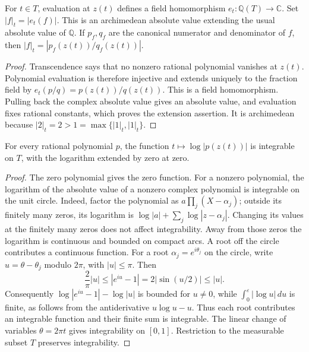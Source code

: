 \begin{definition}
\label{def:rational-archimedean-place}
\leanok
For $t\in T$, evaluation at $z(t)$ defines a field homomorphism
$e_t:\mathbb Q(T)\longrightarrow\mathbb C$. Set $|f|_t=|e_t(f)|$.
This is an archimedean absolute value extending the usual absolute value of $\mathbb Q$.
If $p_f,q_f$ are the canonical numerator and denominator of $f$, then
$|f|_t=|p_f(z(t))/q_f(z(t))|$.
\end{definition}
\begin{proof}
Transcendence says that no nonzero rational polynomial vanishes at $z(t)$.
Polynomial evaluation is therefore injective and extends uniquely to the
fraction field by $e_t(p/q)=p(z(t))/q(z(t))$. This is a field homomorphism.
Pulling back the complex absolute value gives an absolute value, and
evaluation fixes rational constants, which proves the extension assertion.
It is archimedean because $|2|_t=2>1=\max\{|1|_t,|1|_t\}$.
\end{proof}

\begin{lemma}
\label{lem:rational-polynomial-circle-log-integrable}
\leanok
For every rational polynomial $p$, the function
$t\mapsto\log|p(z(t))|$ is integrable on $T$, with the logarithm extended
by zero at zero.
\end{lemma}
\begin{proof}
The zero polynomial gives the zero function. For a nonzero polynomial,
the logarithm of the absolute value of a nonzero
complex polynomial is integrable on the unit circle. Indeed, factor the
polynomial as $a\prod_j(X-\alpha_j)$; outside its finitely many zeros,
its logarithm is $\log|a|+\sum_j\log|z-\alpha_j|$.
Changing its values at the finitely many zeros does not affect integrability.
Away from those zeros the logarithm is continuous and bounded on compact arcs. A root off the
circle contributes a continuous function. For a root
$\alpha_j=e^{i\theta_j}$ on the circle, write $u=\theta-\theta_j$ modulo
$2\pi$, with $|u|\leq\pi$. Then
\[
\frac{2}{\pi}|u|\leq|e^{iu}-1|=2|\sin(u/2)|\leq|u|.
\]
Consequently $\log|e^{iu}-1|-\log|u|$ is bounded for $u\ne0$,
while $\int_0^\varepsilon|\log u|\,du$ is finite, as follows from the
antiderivative $u\log u-u$. Thus each root contributes an integrable
function and their finite sum is integrable. The linear change of
variables $\theta=2\pi t$ gives integrability on $[0,1]$.
Restriction to the measurable subset $T$ preserves integrability.
\end{proof}

